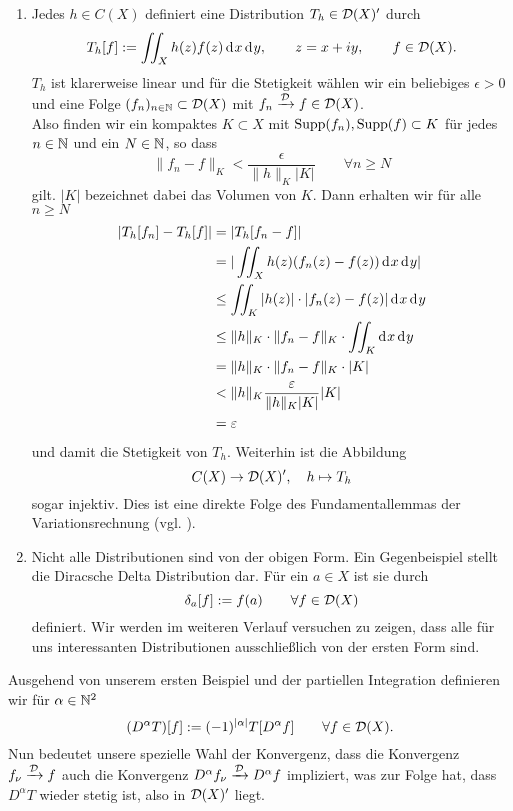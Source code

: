 \begin{bsp}
  \begin{enumerate}
  \item Jedes $h \in C(X)$ definiert eine Distribution $T_h \in
    \mathcal{D}(X)'$ durch
    \[
    T_h[f] := \iint_X h(z) f(z) \d[x]\d[y], \qquad z = x+iy, \qquad f
    \in \dist(X).
    \]
    $T_h$ ist klarerweise linear und für die Stetigkeit wählen wir ein
    beliebiges $\epsilon > 0$ und eine Folge $(f_n)_{n \in\mathbb{N}} \subset
    \mathcal{D}(X)$ mit $f_n \xrightarrow{\mathcal{D}} f \in \mathcal{D}(X)$. \\
    Also finden wir ein kompaktes $K \subset X$ mit $\operatorname{Supp}(f_n),
    \operatorname{Supp}(f) \subset K$ für jedes $n \in \mathbb{N}$ und ein $N \in \mathbb{N}$, so
    dass
    \[
    \|f_n -f\|_K < \frac{\epsilon}{\|h\|_K |K|} \qquad \forall n \geq N
    \]
    gilt. $|K|$ bezeichnet dabei das Volumen von $K$. Dann erhalten wir für
    alle $n \geq N$
    \begin{align*}
      |T_h[f_n] - T_h[f]| & = | T_h[f_n -f]| \\
      & = | \iint_X h(z) (f_n(z) - f(z)) \d[x]\d[y]| \\
      & \leq \iint_K |h(z)| \cdot |f_n(z) - f(z)| \d[x]\d[y]\\
      & \leq \|h\|_K \cdot\|f_n - f\|_K \cdot \iint_K \d[x] \d[y] \\
      & = \|h\|_K \cdot \|f_n - f\|_K \cdot |K| \\
      & < \|h\|_K \frac{\epsilon}{\|h\|_K |K|} |K| \\
      & = \epsilon
    \end{align*}
    und damit die Stetigkeit von $T_h$.
    Weiterhin ist die Abbildung
    \[
    C(X) \rightarrow \mathcal{D}(X)', \quad h \mapsto T_h
    \]
    sogar injektiv. Dies ist eine direkte Folge des 
    Fundamentallemmas der Variationsrechnung (vgl. \cite[§10 HS3]{ForAna}).
  \item Nicht alle Distributionen sind von der obigen Form. Ein
    Gegenbeispiel stellt die Diracsche Delta Distribution dar. Für ein
    $a \in X$ ist sie durch
    \[
    \delta_a[f] := f(a) \qquad \forall f \in \mathcal{D}(X)
    \]
    definiert. Wir werden im weiteren Verlauf versuchen
    zu zeigen, dass alle für uns interessanten Distributionen
    ausschließlich von der
    ersten Form sind.
  \end{enumerate}
\end{bsp}

\begin{defin} 
  Ausgehend von unserem ersten Beispiel und der partiellen Integration
  definieren wir für $\alpha \in \mathbb{N}^2$
  \[
  (D^\alpha T)[f] := (-1)^{|\alpha|} T[D^\alpha f] \qquad \forall f
  \in \mathcal{D}(X).
  \]
  Nun bedeutet unsere spezielle Wahl der Konvergenz, dass die
  Konvergenz $f_\nu \xrightarrow{\mathcal{D}} f$ auch die Konvergenz
  $D^\alpha f_\nu \xrightarrow{\mathcal{D}} D^\alpha f$ impliziert, was zur
  Folge hat, dass $D^\alpha T$ wieder stetig ist, also in $\mathcal{D}(X)'$ liegt.
\end{defin}

